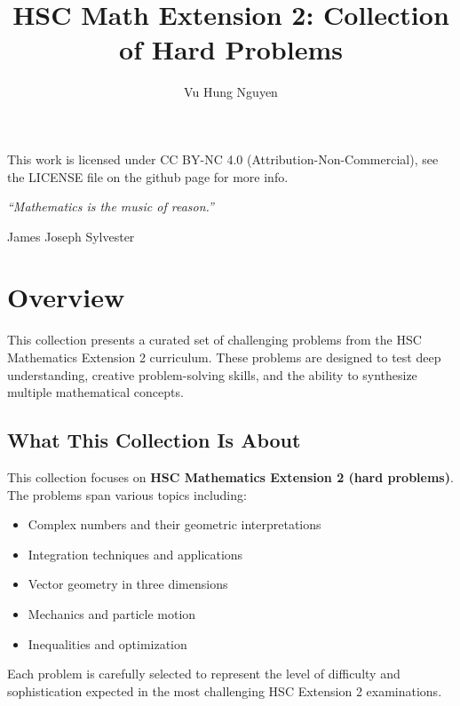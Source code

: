 \documentclass[12pt]{article}
\author{Vu Hung Nguyen}
\title{HSC Math Extension 2: Collection of Hard Problems}
\date{}
\begin{document}


\newpage


\begingroup\small\noindent This work is licensed under CC BY-NC 4.0 (Attribution-Non-Commercial), see the LICENSE file on the github page for more info.\par\endgroup

\newpage
\thispagestyle{empty}
\vspace*{\fill}
\begin{center}
\itshape
``Mathematics is the music of reason.''

\vspace{1em}
\normalfont James Joseph Sylvester
\end{center}
\vspace*{\fill}

\newpage
\tableofcontents
\newpage

\section{Overview}

This collection presents a curated set of challenging problems from the HSC Mathematics Extension 2 curriculum. These problems are designed to test deep understanding, creative problem-solving skills, and the ability to synthesize multiple mathematical concepts.

\subsection{What This Collection Is About}

This collection focuses on \textbf{HSC Mathematics Extension 2 (hard problems)}. The problems span various topics including:
\begin{itemize}
    \item Complex numbers and their geometric interpretations
    \item Integration techniques and applications
    \item Vector geometry in three dimensions
    \item Mechanics and particle motion
    \item Inequalities and optimization
\end{itemize}

Each problem is carefully selected to represent the level of difficulty and sophistication expected in the most challenging HSC Extension 2 examinations.
\end{document}
